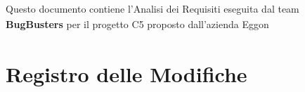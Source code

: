 ﻿\documentclass[a4paper,11pt]{article}
\begin{document}
\begin{center}
\begin{tcolorbox}[colback=secondaryblue!10,colframe=secondaryblue,width=0.9\textwidth,arc=3mm,boxrule=0.8pt,title={\bfseries Abstract}]
Questo documento contiene l'Analisi dei Requisiti\textsubscript{} eseguita dal team \textbf{BugBusters} per il progetto\textsubscript{} C5 proposto dall'azienda Eggon
\end{tcolorbox}
\end{center}



\newpage

\section*{Registro delle Modifiche}

\setlength{\extrarowheight}{2pt}
\renewcommand{\arraystretch}{1.5}
\end{document}
